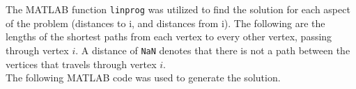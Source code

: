 \documentclass[../report/main.tex]{subfiles}
\begin{document}
\begin{enumerate}[a)]
  The MATLAB function \verb|linprog| was utilized to find the solution for each aspect of the problem (distances to i, and distances from i). The following are the lengths of the shortest paths from each vertex to every other vertex, passing through vertex $i$. A distance of \verb|NaN| denotes that there is not a path between the vertices that travels through vertex $i$. \\

  

  The following MATLAB code was used to generate the solution.

  

    
\end{enumerate}
\end{document}
